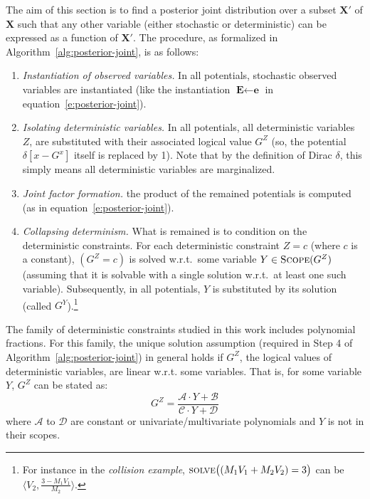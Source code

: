 \documentclass[letterpaper]{article}
\newcommand{\tuple}[1] {\langle #1 \rangle}
\newcommand{\bvec}[1]{\textbf{#1}}
\begin{document}
The aim of this section is to find a posterior joint distribution over a subset $\bvec{X}'$ of $\bvec{X}$
such that any other variable (either stochastic or deterministic)
can be expressed as a function of $\bvec{X}'$.
The procedure, as formalized in Algorithm~\ref{alg:posterior-joint}, is as follows: 
\begin{enumerate}
\item \emph{Instantiation of observed variables.} In all potentials, stochastic observed variables are instantiated
(like the instantiation $\bvec{E} \leftarrow \bvec{e}$ in equation~\ref{e:posterior-joint}).
%
\item \emph{Isolating deterministic variables.} In all potentials, all deterministic variables $Z$, are 
substituted with their associated logical value $G^Z$ (so, the potential $\delta[x - G^x]$ itself is replaced by 1). Note that by the definition of Dirac $\delta$, this simply means all deterministic variables are marginalized.
%
\item \emph{Joint factor formation.} the product of the remained potentials is computed (as in equation~\ref{e:posterior-joint}).   
%
\item \emph{Collapsing determinism.} 
What is remained is to condition on the deterministic constraints.
For each deterministic constraint $Z = c$ (where $c$ is a constant),
$(G^Z = c)$ is solved w.r.t.\ some variable $Y \in \textsc{Scope}(G^Z)$ (assuming that it is solvable with a single solution w.r.t.\ at least one such variable).
Subsequently, in all potentials, $Y$ is substituted by its solution (called $G^Y$).\footnote{For instance in the \emph{collision example}, 
$\textsc{solve}\big((M_1 V_1 + M_2 V_2)=3 \big)$ can be $\tuple{V_2, \frac{3 - M_1 V_1}{M_2}}$.} 
%
\end{enumerate}

The family of deterministic constraints studied in this work includes polynomial fractions.
For this family, 
the unique solution assumption (required in Step 4 of Algorithm~\ref{alg:posterior-joint})
in general holds if $G^Z$, the logical values of deterministic variables, are linear w.r.t. some variables.
That is, for some variable $Y$, $G^Z$ can be stated as: 
\begin{equation}
\label{eq:evidence-form}
G^Z = \frac{\mathcal{A} \cdot Y + \mathcal{B}}{\mathcal{C} \cdot Y + \mathcal{D}}
\end{equation}
where $\mathcal{A}$ to $\mathcal{D}$ are constant or univariate/multivariate polynomials and $Y$ is not in their scopes.
\end{document}
